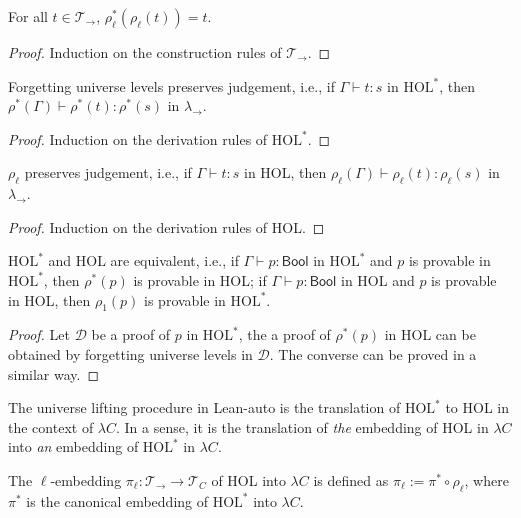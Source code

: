   \begin{theorem}
    For all $t \in \mathcal{T}_\to$, $\rho_\ell^*(\rho_\ell(t)) = t$.
    \begin{proof} Induction on the construction rules of $\mathcal{T}_\to$. \end{proof}
  \end{theorem}

  \begin{theorem}
    Forgetting universe levels preserves judgement, i.e., if $\Gamma \vdash t : s$ in $\text{HOL}^*$,
    then $\rho^*(\Gamma) \vdash \rho^*(t) : \rho^*(s)$ in $\lambda_\to$.
    \begin{proof} Induction on the derivation rules of $\text{HOL}^*$. \end{proof}
  \end{theorem}

  \begin{theorem}
    $\rho_\ell$ preserves judgement, i.e., if $\Gamma \vdash t : s$ in HOL, then
    $\rho_\ell(\Gamma) \vdash \rho_\ell(t) : \rho_\ell(s)$ in $\lambda_\to$.
    \begin{proof} Induction on the derivation rules of HOL. \end{proof}
  \end{theorem}

  \begin{theorem}
    $\text{HOL}^*$ and HOL are equivalent, i.e., if $\Gamma \vdash p : \mathsf{Bool}$ in $\text{HOL}^*$
    and $p$ is provable in $\text{HOL}^*$, then $\rho^*(p)$ is provable in HOL; if $\Gamma \vdash p : \mathsf{Bool}$
    in HOL and $p$ is provable in HOL, then $\rho_1(p)$ is provable in $\text{HOL}^*$.
    \begin{proof}
      Let $\mathcal{D}$ be a proof of $p$ in $\text{HOL}^*$, the a proof of
      $\rho^*(p)$ in HOL can be obtained by forgetting universe levels in $\mathcal{D}$.
      The converse can be proved in a similar way.
    \end{proof}
  \end{theorem}

  \noindent The universe lifting procedure in Lean-auto is the translation of $\text{HOL}^*$
  to HOL in the context of $\lambda C$. In a sense, it is the translation of \textit{the}
  embedding of HOL in $\lambda C$ into \textit{an} embedding of $\text{HOL}^*$ in $\lambda C$.

  \begin{definition}
    The $\ell$-embedding $\pi_\ell : \mathcal{T}_\to \to \mathcal{T}_C$ of HOL into
    $\lambda C$ is defined as $\pi_\ell := \pi^* \circ \rho_\ell$, where $\pi^*$ is the
    canonical embedding of $\text{HOL}^*$ into $\lambda C$.
  \end{definition}

